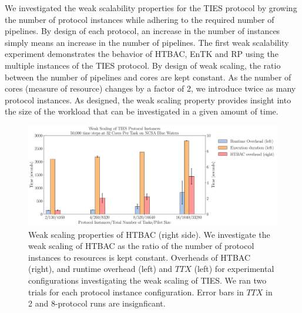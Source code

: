 

We investigated the weak scalability properties for the TIES protocol by
growing the number of protocol instances while adhering to the required number
of pipelines. By design of each protocol, an increase in the number of
instances simply means an increase in the number of pipelines. The first weak
scalability experiment demonstrates the behavior of HTBAC, EnTK and RP using
the multiple instances of the TIES protocol. By design of weak scaling, the
ratio between the number of pipelines and cores are kept constant. As the
number of cores (measure of resource) changes by a factor of 2, we introduce
twice as many protocol instances. As designed, the weak scaling property
provides insight into the size of the workload that can be investigated in a
given amount of time.

\begin{figure}
  \centering
   \includegraphics[width=\columnwidth]{./figures/weak_scaling_TIES_instances_50,000_timesteps_with_16_instances.pdf}
  \caption{Weak scaling properties of HTBAC (right side). We investigate the
  weak scaling of HTBAC as the ratio of the number of protocol instances to
  resources is kept constant. Overheads of HTBAC (right), and runtime overhead (left) and \(TTX\) (left) for
  experimental configurations investigating the weak scaling of TIES. We ran two trials for each protocol instance configuration. Error bars in \(TTX\) in 2 and 8-protocol runs are insignficant.}
\label{fig:weak_scaling}
\end{figure}

